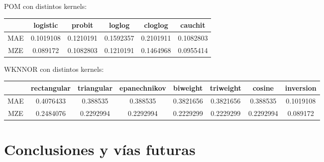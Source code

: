 POM con distintos kernels:
\begin{center}
\begin{tabular}{ c c c c c c }
	& logistic & probit & loglog & cloglog & cauchit \\
	\hline	
	MAE &   0.1019108  & 0.1210191 & 0.1592357  &  0.2101911 & 0.1082803\\
	MZE &	0.089172 & 0.1082803 & 0.1210191 & 0.1464968 &  0.0955414\\
	\hline  
\end{tabular}
\end{center}
\vspace{20pt}

WKNNOR con distintos kernels:

\begin{center}
\begin{tabular}{ c c c c c c c c }

	& rectangular & triangular & epanechnikov & biweight & triweight & cosine & inversion \\
	\hline	
	MAE &   0.4076433  & 0.388535 & 0.388535  &  0.3821656 & 0.3821656 & 0.388535 & 0.1019108 \\
	MZE &	0.2484076 & 0.2292994 & 0.2292994 & 0.2229299 & 0.2229299 & 0.2292994 & 0.089172  \\
	\hline  
\end{tabular}
\end{center}

\section{Conclusiones y vías futuras}
